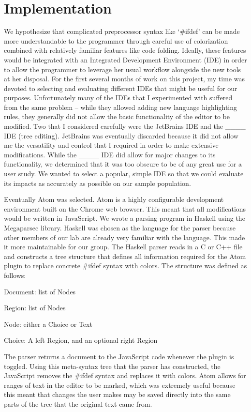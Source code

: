 \section{Implementation}
We hypothesize that complicated preprocessor syntax like ‘\#ifdef’ can be made more understandable to the programmer through careful use of colorization combined with relatively familiar features like code folding. Ideally, these features would be integrated with an Integrated Development Environment (IDE) in order to allow the programmer to leverage her usual workflow alongside the new tools at her disposal. For the first several months of work on this project, my time was devoted to selecting and evaluating different IDEs that might be useful for our purposes. Unfortunately many of the IDEs that I experimented with suffered from the same problem – while they allowed adding new language highlighting rules, they generally did not allow the basic functionality of the editor to be modified. Two that I considered carefully were the JetBrains IDE and the \_\_\_\_ IDE (tree editing). JetBrains was eventually discarded because it did not allow me the versatility and control that I required in order to make extensive modifications. While the \_\_\_\_ IDE did allow for major changes to its functionality, we determined that it was too obscure to be of any great use for a user study. We wanted to select a popular, simple IDE so that we could evaluate its impacts as accurately as possible on our sample population. 

Eventually Atom was selected. Atom is a highly configurable development environment built on the Chrome web browser. This meant that all modifications would be written in JavaScript. We wrote a parsing program in Haskell using the Megaparsec library. Haskell was chosen as the language for the parser because other members of our lab are already very familiar with the language. This made it more maintainable for our group. The Haskell parser reads in a C or C++ file and constructs a tree structure that defines all information required for the Atom plugin to replace concrete \#ifdef syntax with colors. The structure was defined as follows:

	Document: list of Nodes

	Region: list of Nodes

Node: either a Choice or Text

	Choice: A left Region, and an optional right Region

The parser returns a document to the JavaScript code whenever the plugin is toggled. Using this meta-syntax tree that the parser has constructed, the JavaScript removes the \#ifdef syntax and replaces it with colors. Atom allows for ranges of text in the editor to be marked, which was extremely useful because this meant that changes the user makes may be saved directly into the same parts of the tree that the original text came from.

